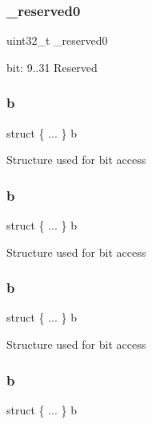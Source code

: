 \subsubsection{\texorpdfstring{\_reserved0}{\_reserved0}}
{\footnotesize\ttfamily uint32\+\_\+t \+\_\+reserved0}

bit\+: 9..31 Reserved \mbox{\label{union_i_p_s_r___type_a3758147356a15906221a5625a27d9048}} 
\subsubsection{\texorpdfstring{b}{b}\hspace{0.1cm}{\footnotesize\ttfamily [1/6]}}
{\footnotesize\ttfamily struct \{ ... \}   b}

Structure used for bit access \mbox{\label{union_i_p_s_r___type_a77bc2e3569776643bbcd77a7b2bc69c3}} 
\subsubsection{\texorpdfstring{b}{b}\hspace{0.1cm}{\footnotesize\ttfamily [2/6]}}
{\footnotesize\ttfamily struct \{ ... \}   b}

Structure used for bit access \mbox{\label{union_i_p_s_r___type_ac084c51939b6ba8158a34b784e88a14b}} 
\subsubsection{\texorpdfstring{b}{b}\hspace{0.1cm}{\footnotesize\ttfamily [3/6]}}
{\footnotesize\ttfamily struct \{ ... \}   b}

Structure used for bit access \mbox{\label{union_i_p_s_r___type_ac4b1360265e95e8f834ee8f804b83f3a}} 
\subsubsection{\texorpdfstring{b}{b}\hspace{0.1cm}{\footnotesize\ttfamily [4/6]}}
{\footnotesize\ttfamily struct \{ ... \}   b}

